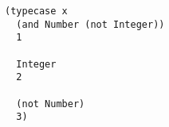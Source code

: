 \begin{lstlisting}[style=reclojureClojure]
(typecase x
  (and Number (not Integer))
  1

  Integer
  2

  (not Number)
  3)
\end{lstlisting}
